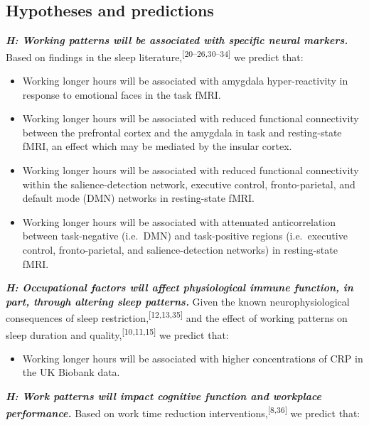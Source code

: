 \documentclass[
  english,
  man, donotrepeattitle]{apa6}
\providecommand{\tightlist}{%
  \setlength{\itemsep}{0pt}\setlength{\parskip}{0pt}}
\begin{document}
\newpage

\hypertarget{hypotheses-and-predictions}{%
\subsection{Hypotheses and predictions}\label{hypotheses-and-predictions}}

\textbf{\emph{H: Working patterns will be associated with specific neural markers.}} Based on findings in the sleep literature,\textsuperscript{{[}20--26,30--34{]}} we predict that:

\begin{itemize}
\item
  Working longer hours will be associated with amygdala hyper-reactivity in response to emotional faces in the task fMRI.
\item
  Working longer hours will be associated with reduced functional connectivity between the prefrontal cortex and the amygdala in task and resting-state fMRI, an effect which may be mediated by the insular cortex.
\item
  Working longer hours will be associated with reduced functional connectivity within the salience-detection network, executive control, fronto-parietal, and default mode (DMN) networks in resting-state fMRI.
\item
  Working longer hours will be associated with attenuated anticorrelation between task-negative (i.e.~DMN) and task-positive regions (i.e.~executive control, fronto-parietal, and salience-detection networks) in resting-state fMRI.
\end{itemize}

\hspace{1cm}

\textbf{\emph{H: Occupational factors will affect physiological immune function, in part, through altering sleep patterns.}} Given the known neurophysiological consequences of sleep restriction,\textsuperscript{{[}12,13,35{]}} and the effect of working patterns on sleep duration and quality,\textsuperscript{{[}10,11,15{]}} we predict that:

\begin{itemize}
\tightlist
\item
  Working longer hours will be associated with higher concentrations of CRP in the UK Biobank data.
\end{itemize}

\hspace{1cm}

\textbf{\emph{H: Work patterns will impact cognitive function and workplace performance.}} Based on work time reduction interventions,\textsuperscript{{[}8,36{]}} we predict that:
\end{document}
